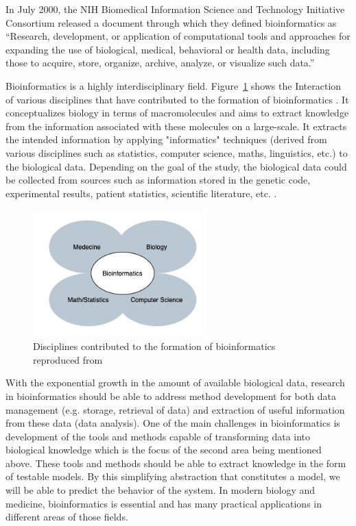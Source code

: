 In July 2000, the NIH Biomedical Information Science and Technology Initiative Consortium released a document \cite{huerta_nih_2000} 
through which they defined bioinformatics as “Research, development, or application of computational tools and approaches 
for expanding the use of biological, medical, behavioral or health data, including those to acquire, store, organize, 
archive, analyze, or visualize such data.”

Bioinformatics is a highly interdisciplinary field. Figure~\ref{fig:bioinformaticsDisciplines} shows the Interaction 
of various disciplines that have contributed to the formation of bioinformatics \cite{bayat_science_2002}. 
It conceptualizes biology in terms of macromolecules and aims to extract knowledge from the information associated with 
these molecules on a large-scale. It extracts the intended information by applying "informatics" techniques 
(derived from various disciplines such as statistics, computer science, maths, linguistics, etc.) to the biological data. 
Depending on the goal of the study, the biological data could be collected from sources such as information stored in the 
genetic code, experimental results, patient statistics, scientific literature, etc. 
\cite{nilges_bioinformatics-definition_2011,luscombe_what_2001}.

\begin{figure}[ht]
    \centering
    \includegraphics[width=0.60\textwidth]{figures/05Bioinformatics.jpg}
    \caption{Disciplines contributed to the formation of bioinformatics reproduced from~\cite{bayat_science_2002}}
    \label{fig:bioinformaticsDisciplines}
\end{figure}


With the exponential growth in the amount of available biological data, research in bioinformatics should be able to 
address method development for both data management (e.g. storage, retrieval of data) and extraction of useful information 
from these data (data analysis). One of the main challenges in bioinformatics is development of the tools and methods capable 
of transforming data into biological knowledge which is the focus of the second area being mentioned above. These tools and 
methods should be able to extract knowledge in the form of testable models. By this simplifying abstraction that constitutes 
a model, we will be able to predict the behavior of the system. In modern biology and medicine, bioinformatics is essential 
and has many practical applications in different areas of those fields.


